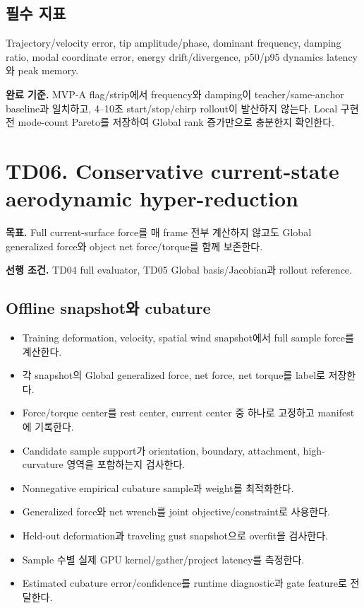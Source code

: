 \documentclass[10pt,a4paper]{article}
\newcommand{\todo}{\textcolor{TodoGray}{\(\square\)}}
\begin{document}
\subsection*{필수 지표}

Trajectory/velocity error, tip amplitude/phase, dominant frequency, damping ratio,
modal coordinate error, energy drift/divergence, p50/p95 dynamics latency와 peak memory.

\textbf{완료 기준.}
MVP-A flag/strip에서 frequency와 damping이 teacher/same-anchor baseline과 일치하고,
4--10초 start/stop/chirp rollout이 발산하지 않는다.
Local 구현 전 mode-count Pareto를 저장하여 Global rank 증가만으로 충분한지 확인한다.

\section{TD06. Conservative current-state aerodynamic hyper-reduction}

\textbf{목표.}
Full current-surface force를 매 frame 전부 계산하지 않고도 Global generalized force와 object net force/torque를 함께 보존한다.

\textbf{선행 조건.} TD04 full evaluator, TD05 Global basis/Jacobian과 rollout reference.

\subsection*{Offline snapshot와 cubature}

\begin{itemize}
  \item[\todo] Training deformation, velocity, spatial wind snapshot에서 full sample force를 계산한다.
  \item[\todo] 각 snapshot의 Global generalized force, net force, net torque를 label로 저장한다.
  \item[\todo] Force/torque center를 rest center, current center 중 하나로 고정하고 manifest에 기록한다.
  \item[\todo] Candidate sample support가 orientation, boundary, attachment, high-curvature 영역을 포함하는지 검사한다.
  \item[\todo] Nonnegative empirical cubature sample과 weight를 최적화한다.
  \item[\todo] Generalized force와 net wrench를 joint objective/constraint로 사용한다.
  \item[\todo] Held-out deformation과 traveling gust snapshot으로 overfit을 검사한다.
  \item[\todo] Sample 수별 실제 GPU kernel/gather/project latency를 측정한다.
  \item[\todo] Estimated cubature error/confidence를 runtime diagnostic과 gate feature로 전달한다.
\end{itemize}
\end{document}

